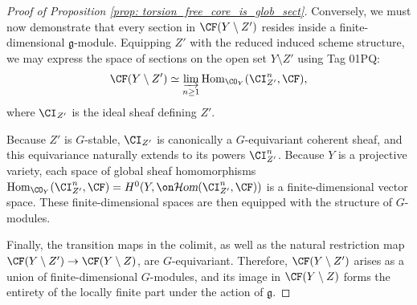 \documentclass[11pt,reqno]{amsart}
\begin{document}
\begin{proof}[Proof of Proposition \ref{prop: torsion_free_core_is_glob_sect}]
    Conversely, we must now demonstrate that every section in $\CF(Y \setminus Z')$ resides inside a finite-dimensional $\mathfrak{g}$-module. Equipping $Z'$ with the reduced induced scheme structure, we may express the space of sections on the open set $Y \setminus Z'$ using Tag 01PQ:
    \[
        \CF(Y \setminus Z') \simeq \varinjlim_{n \ge 1} \operatorname{Hom}_{\CO_Y}(\CI_{Z'}^n, \CF),
    \]
    where $\CI_{Z'}$ is the ideal sheaf defining $Z'$. 
    
    Because $Z'$ is $G$-stable, $\CI_{Z'}$ is canonically a $G$-equivariant coherent sheaf, and this equivariance naturally extends to its powers $\CI_{Z'}^n$. Because $Y$ is a projective variety, each space of global sheaf homomorphisms $\operatorname{Hom}_{\CO_Y}(\CI_{Z'}^n, \CF) = H^0(Y, \shom(\CI_{Z'}^n, \CF))$ is a finite-dimensional vector space. These finite-dimensional spaces are then equipped with the structure of $G$-modules.
    
    Finally, the transition maps in the colimit, as well as the natural restriction map $\CF(Y \setminus Z') \to \CF(Y \setminus Z)$, are $G$-equivariant. Therefore, $\CF(Y \setminus Z')$ arises as a union of finite-dimensional $G$-modules, and its image in $\CF(Y \setminus Z)$ forms the entirety of the locally finite part under the action of $\mathfrak{g}$. 
\end{proof}




\end{document}
